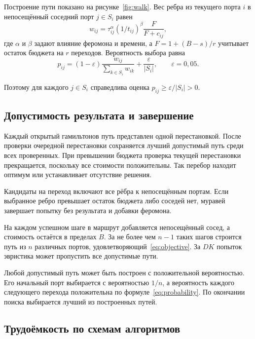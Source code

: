 Построение пути показано на рисунке~\ref{fig:walk}. Вес ребра из текущего порта $i$ в непосещённый соседний порт $j\in S_i$ равен
\begin{equation}
w_{ij} = \tau_{ij}^{\alpha}(1/t_{ij})^{\beta}\frac{F}{F+c_{ij}},
\label{eq:weight}
\end{equation}
\hspace*{\parindent}где $\alpha$ и $\beta$ задают влияние феромона и времени, а $F=1+(B-s)/r$ учитывает остаток бюджета на $r$ переходов. Вероятность выбора равна
\begin{equation}
p_{ij}=(1-\varepsilon)\frac{w_{ij}}{\sum_{k\in S_i} w_{ik}}+
       \frac{\varepsilon}{|S_i|},
\qquad \varepsilon=0{,}05.
\label{eq:probability}
\end{equation}

Поэтому для каждого $j\in S_i$ справедлива оценка $p_{ij}\geq\varepsilon/|S_i|>0$.


\clearpage
\subsection{Допустимость результата и завершение}

Каждый открытый гамильтонов путь представлен одной перестановкой. После проверки очередной перестановки сохраняется лучший допустимый путь среди всех проверенных. При превышении бюджета проверка текущей перестановки прекращается, поскольку все стоимости положительны. Так перебор находит оптимум или устанавливает отсутствие решения.

Кандидаты на переход включают все рёбра к непосещённым портам. Если выбранное ребро превышает остаток бюджета либо соседей нет, муравей завершает попытку без результата и добавки феромона.

На каждом успешном шаге в маршрут добавляется непосещённый сосед, а стоимость остаётся в пределах $B$. За не более чем $n-1$ таких шагов строится путь из $n$ различных портов, удовлетворяющий~\eqref{eq:objective}. За $DK$ попыток эвристика может пропустить все допустимые пути.

Любой допустимый путь может быть построен с положительной вероятностью. Его начальный порт выбирается с вероятностью $1/n$, а вероятность каждого следующего перехода положительна по формуле~\eqref{eq:probability}. По окончании поиска выбирается лучший из построенных путей.

\subsection{Трудоёмкость по схемам алгоритмов}

